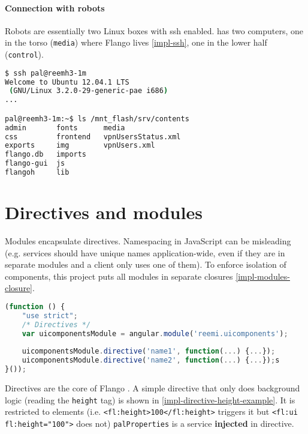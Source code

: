 

\paragraph{Connection with robots} Robots are essentially two Linux boxes with \ac{ssh} enabled.
 has two computers, one in the torso (\texttt{media}) where Flango lives \ref{impl-ssh}, one in the lower half (\texttt{control}).

\begin{lstlisting}[columns=fixed,language=bash,caption=Connection with robots, label=impl-ssh]
$ ssh pal@reemh3-1m
Welcome to Ubuntu 12.04.1 LTS 
 (GNU/Linux 3.2.0-29-generic-pae i686)
...

pal@reemh3-1m:~$ ls /mnt_flash/srv/contents
admin       fonts      media
css         frontend   vpnUsersStatus.xml     
exports     img        vpnUsers.xml
flango.db   imports    
flango-gui  js         
flangoh     lib
\end{lstlisting}


\section{Directives and modules}
Modules encapsulate directives.
Namespacing in JavaScript can be misleading (e.g. services should have unique names application-wide, even if they are in separate modules and a client only uses one of them).
To enforce isolation of components, this project puts all modules in separate closures \ref{impl-modules-closure}.

\begin{lstlisting}[language=JavaScript, caption=Closures to isolate modules, label=impl-modules-closure]
(function () {
    "use strict";
    /* Directives */
    var uicomponentsModule = angular.module('reemi.uicomponents');
    
    uicomponentsModule.directive('name1', function(...) {...});
    uicomponentsModule.directive('name2', function(...) {...});s
}());
\end{lstlisting}

Directives are the core of Flango \cm .
A simple directive that only does background logic (reading the \texttt{height} tag) is shown in \ref{impl-directive-height-example}.
It is restricted to elements (i.e. \lstinline$<fl:height>100</fl:height>$ triggers it but \lstinline$<fl:ui fl:height="100">$ does not)
\texttt{palProperties} is a service \textbf{injected} in directive.

